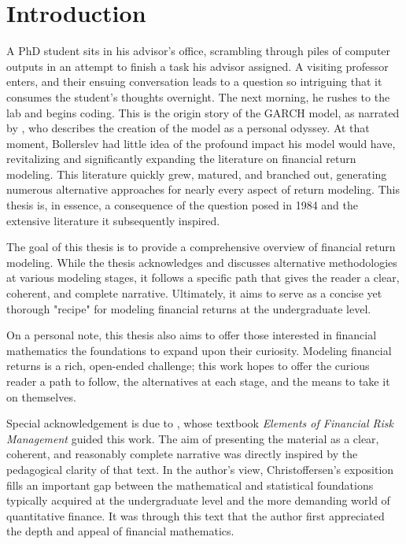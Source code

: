 \chapter*{Introduction}

A PhD student sits in his advisor’s office, scrambling through piles of computer outputs in an attempt to finish a task his advisor assigned. A visiting professor enters, and their ensuing conversation leads to a question so intriguing that it consumes the student’s thoughts overnight. The next morning, he rushes to the lab and begins coding. This is the origin story of the GARCH model, as narrated by , who describes the creation of the model as a personal odyssey. At that moment, Bollerslev had little idea of the profound impact his model would have, revitalizing and significantly expanding the literature on financial return modeling. This literature quickly grew, matured, and branched out, generating numerous alternative approaches for nearly every aspect of return modeling. This thesis is, in essence, a consequence of the question posed in 1984 and the extensive literature it subsequently inspired.

The goal of this thesis is to provide a comprehensive overview of financial return modeling. While the thesis acknowledges and discusses alternative methodologies at various modeling stages, it follows a specific path that gives the reader a clear, coherent, and complete narrative. Ultimately, it aims to serve as a concise yet thorough "recipe" for modeling financial returns at the undergraduate level. 

On a personal note, this thesis also aims to offer those interested in financial mathematics the foundations to expand upon their curiosity. Modeling financial returns is a rich, open-ended challenge; this work hopes to offer the curious reader a path to follow, the alternatives at each stage, and the means to take it on themselves.

Special acknowledgement is due to , whose textbook \emph{Elements of Financial Risk Management} guided this work. The aim of presenting the material as a clear, coherent, and reasonably complete narrative was directly inspired by the pedagogical clarity of that text. In the author’s view, Christoffersen’s exposition fills an important gap between the mathematical and statistical foundations typically acquired at the undergraduate level and the more demanding world of quantitative finance. It was through this text that the author first appreciated the depth and appeal of financial mathematics.


